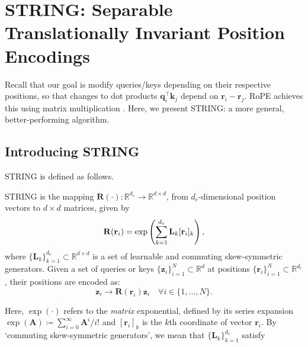 \section{STRING: Separable Translationally Invariant Position Encodings} \label{sec:string_core_section}

Recall that our goal is modify queries/keys depending on their respective positions, so that changes to dot products $\mathbf{q}_i^\top \mathbf{k}_j$ depend on $\mathbf{r}_i - \mathbf{r}_j$.
RoPE achieves this using matrix multiplication \citep{su2024roformer}. 
Here, we present STRING: a more general, better-performing algorithm. %

\subsection{Introducing STRING}
STRING is defined as follows.
\begin{tcolorbox}[colback=gray!10!white,colframe=gray!50!black,arc=0mm,boxrule=0.5pt]
\begin{definition} \label{def:coupled_norms_def}
STRING is the mapping $\mathbf{R}(\cdot): \mathbb{R}^{d_c} \to \mathbb{R}^{d \times d}$, from $d_c$-dimensional position vectors to $d \times d$ matrices, given by \vspace{-2mm}
\begin{equation} 
\label{eq:string_multiply_general}
    \mathbf{R}(\mathbf{r}_i) =  \exp \left (\sum_{k=1}^{d_c} \mathbf{L}_k [\mathbf{r}_i]_k \right ), \vspace{-2mm}
\end{equation}
where $\{\mathbf{L}_k\}_{k=1}^{d_c} \subset \mathbb{R}^{d \times d}$ is a set of learnable and commuting skew-symmetric generators.
Given a set of queries or keys $\{\mathbf{z}_i\}_{i=1}^N \subset \mathbb{R}^d$ at positions $\{\mathbf{r}_i\}_{i=1}^N \subset \mathbb{R}^{d_c}$, their positions are encoded as: \vspace{-2mm}
\begin{equation}
    \mathbf{z}_i \to \mathbf{R}(\mathbf{r}_i) \mathbf{z}_i \quad \forall i \in \{1,...,N\}.
\end{equation}
\end{definition}
\end{tcolorbox}
Here, $\exp(\cdot)$ refers to the \emph{matrix} exponential, defined by its series expansion $\exp(\mathbf{A})\coloneqq \sum_{i=0}^\infty \mathbf{A}^i / i!$ and
$[\mathbf{r}_i]_k$ is the $k$th coordinate of vector $\mathbf{r}_i$.
By `commuting skew-symmetric generators', we mean that $\{\mathbf{L}_{k}\}_{k=1}^{d_{c}}$ satisfy
